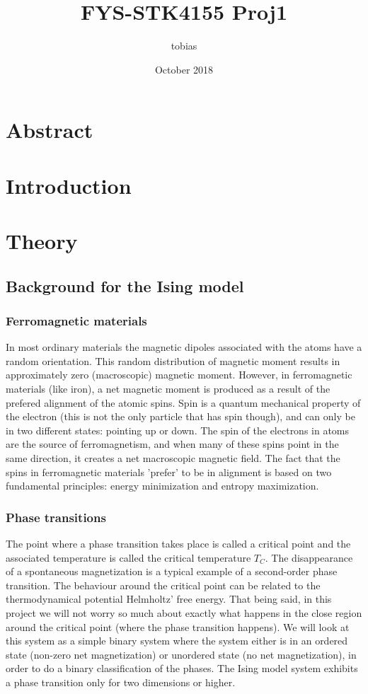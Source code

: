 \documentclass[a4paper,12pt]{article}
\title{FYS-STK4155 Proj1}
\author{tobias }
\date{October 2018}
\begin{document}
\maketitle

\section{Abstract}

\section{Introduction}

\section{Theory}

\subsection{Background for the Ising model}

\subsubsection{Ferromagnetic materials}
In most ordinary materials the magnetic dipoles associated with the atoms have a random orientation. This random distribution of magnetic moment results in approximately zero (macroscopic) magnetic moment. However, in ferromagnetic materials (like iron), a net magnetic moment is produced as a result of the prefered alignment of the atomic spins.
Spin is a quantum mechanical property of the electron (this is not the only particle that has spin though), and can only be in two different states: pointing up or down. The spin of the electrons in atoms are the source of ferromagnetism, and when many of these spins point in the same direction, it creates a net macroscopic magnetic field.
The fact that the spins in ferromagnetic materials 'prefer' to be in alignment is based on two fundamental principles: energy minimization and entropy maximization.

\subsubsection{Phase transitions}
The point where a phase transition takes place is called a critical point and the associated temperature is called the critical temperature $T_C$. The disappearance of a spontaneous magnetization is a typical example of a second-order phase transition. The behaviour around the critical point can be related to the thermodynamical potential Helmholtz' free energy. That being said, in this project we will not worry so much about exactly what happens in the close region around the critical point (where the phase transition happens). We will look at this system as a simple binary system where the system either is in an ordered state (non-zero net magnetization) or unordered state (no net magnetization), in order to do a binary classification of the phases.\newline
The Ising model system exhibits a phase transition only for two dimensions or higher.
\end{document}
